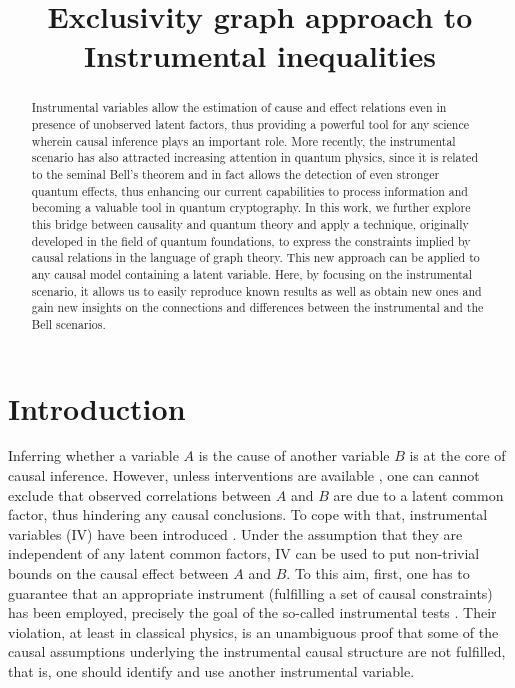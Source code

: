 \documentclass[letterpaper]{article}
\title{Exclusivity graph approach to Instrumental inequalities}
\author{} %
\begin{document}
\maketitle

\begin{abstract}
Instrumental variables allow the estimation of cause and effect relations even
in presence of unobserved latent factors, thus providing a powerful tool for any
science wherein causal inference plays an important role. More recently, the
instrumental scenario has also attracted increasing attention in quantum
physics, since it is related to the seminal Bell's theorem and in fact allows
the detection of even stronger quantum effects, thus enhancing our current
capabilities to process information and becoming a valuable tool in quantum
cryptography. In this work, we further explore this bridge between causality and
quantum theory and apply a technique, originally developed in the field of
quantum foundations, to express the constraints implied by causal relations in
the language of graph theory. This new approach can be applied to any causal
model containing a latent variable. Here, by focusing on the instrumental
scenario, it allows us to easily reproduce known results as well as obtain new
ones and gain new insights on the connections and differences between the
instrumental and the Bell scenarios. 
\end{abstract}

\section*{Introduction}
Inferring  whether a variable $A$ is the cause of another variable $B$ is at the
core of causal inference. However, unless interventions are available
\cite{pearlbook}, one can cannot exclude that observed correlations between $A$ %
and $B$ are due to a latent common factor, thus hindering any causal
conclusions. To cope with that, instrumental variables (IV) have been introduced
\cite{pearl1995, bonet2001}. Under the assumption that they are independent of
any latent common factors, IV can be used to put non-trivial bounds on the
causal effect between $A$ and $B$. To this aim, first, one has to guarantee that
an appropriate instrument (fulfilling a set of causal constraints) has been
employed, precisely the goal of the so-called instrumental tests
\cite{pearl1995, bonet2001}. Their violation, at least in classical physics, is
an unambiguous proof that some of the causal assumptions underlying the
instrumental causal structure are not fulfilled, that is, one should identify
and use another instrumental variable.
\end{document}
